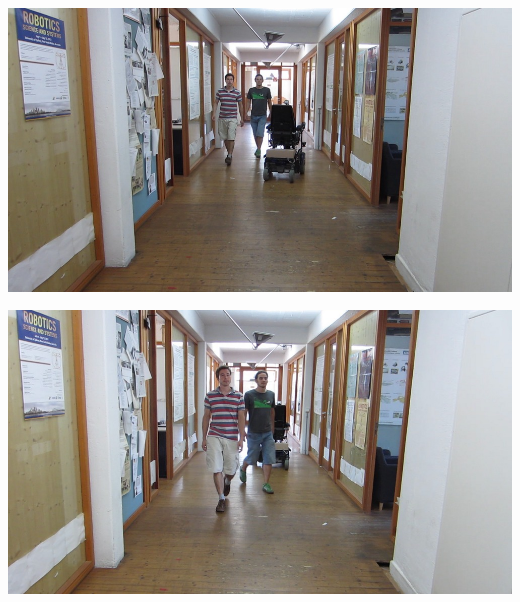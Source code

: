 \documentclass{beamer}
\begin{document}
\begin{frame}
  \includegraphics[width=\textwidth]{images/image-048.jpg}
  \begin{spacing}{0.5}
    {\tiny\color{gray}}
  \end{spacing}
\end{frame}

\begin{frame}
  \includegraphics[width=\textwidth]{images/image-049.jpg}
  \begin{spacing}{0.5}
    {\tiny\color{gray}}
  \end{spacing}
\end{frame}
\end{document}
